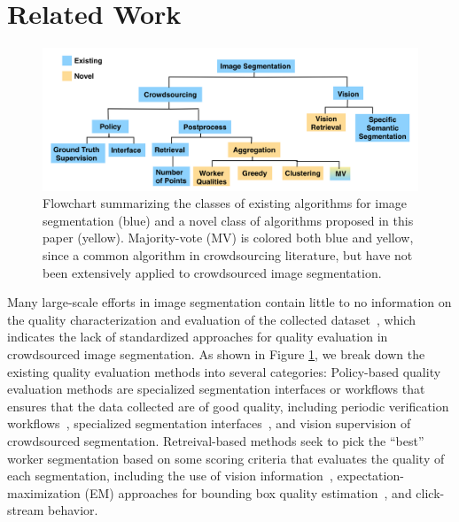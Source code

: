 \section{Related Work\label{sec:related}}
\begin{figure}[h!]
\centering
\includegraphics[width=\linewidth]{plots/flowchart.png}
\caption{Flowchart summarizing the classes of existing algorithms for image segmentation (blue) and a novel class of algorithms proposed in this paper (yellow). Majority-vote (MV) is colored both blue and yellow, since a common algorithm in crowdsourcing literature, but have not been extensively applied to crowdsourced image segmentation.}
\label{flowchart}
\end{figure}
Many large-scale efforts in image segmentation contain little to no information on the quality characterization and evaluation of the collected dataset~\cite{Torralba2010,MartinFTM01,Li2009,Gurari2015}, which indicates the lack of standardized approaches for quality evaluation in crowdsourced image segmentation. As shown in Figure \ref{flowchart}, we break down the existing quality evaluation methods into several categories:
Policy-based quality evaluation methods are specialized segmentation interfaces or workflows that ensures that the data collected are of good quality, including periodic verification workflows~\cite{Lin2014,Everingham15}, specialized segmentation interfaces~\cite{Song2018}, and vision supervision of crowdsourced segmentation\cite{Russakovsky2015,Gurari2016}. %
Retreival-based methods seek to pick the ``best'' worker segmentation based on some scoring criteria that evaluates the quality of each segmentation, including the use of vision information~\cite{Vittayakorn2011,Russakovsky2015}, expectation-maximization (EM) approaches for bounding box quality estimation~\cite{MDWWelinder2010}, and click-stream behavior\cite{Cabezas2015,Sameki2015,Sorokin2008}.

